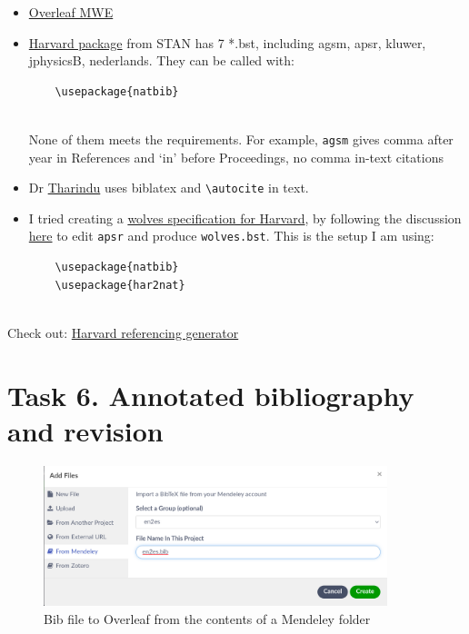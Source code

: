 \documentclass[a4paper,11pt]{article}
\begin{document}
\begin{itemize}
	\item \href{https://www.overleaf.com/project/6227c1c064c39caee9540084}{Overleaf MWE}
	\item \href{https://www.ctan.org/pkg/harvard}{Harvard package} from STAN has 7 *.bst, including agsm, apsr, kluwer, jphysicsB, nederlands. They can be called with:
	
	\begin{lstlisting}
	\usepackage{natbib}
	
	\end{lstlisting}
	
	None of them meets the requirements. For example, \verb|agsm| gives comma after year in References and `in' before Proceedings, no comma in-text citations
	
	\item Dr \href{https://github.com/TharinduDR/Thesis/}{Tharindu} uses biblatex and 
	\verb|\autocite| in text.
	\item I tried creating a \href{https://github.com/kunilovskaya/dskills_workshop/tree/main/w3_bibs_beamer/wolves.bst}{wolves specification for Harvard}, by following the discussion \href{https://tex.stackexchange.com/questions/134258/harvard-style-bibliography-with-biblatex-almost-but-not-quite/134264#134264}{here} to edit \verb|apsr| and produce \verb|wolves.bst|. This is the setup I am using:
	
	\begin{lstlisting}
	\usepackage{natbib}
	\usepackage{har2nat}
	
	\end{lstlisting}
	
\end{itemize}

Check out: \href{https://www.mybib.com/tools/harvard-referencing-generator}{Harvard referencing generator}

\section*{Task 6. Annotated bibliography and revision}
\label{task}

\begin{figure}[h!]
	\centering
	\label{fig:integrate}
	\includegraphics[width=10cm]{pics/group_bib.png}
	\caption{Bib file to Overleaf from the contents of a Mendeley folder}
\end{figure}
\end{document}
